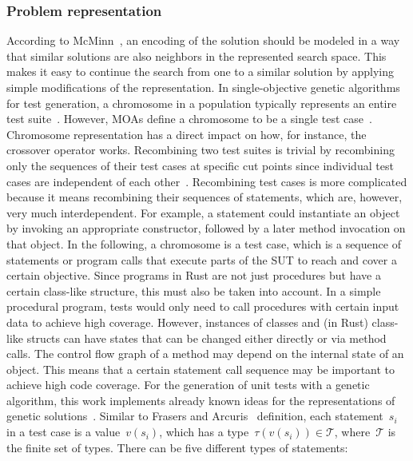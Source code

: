 \documentclass{article}
\begin{document}
\subsubsection{Problem representation}
\label{sec:problem-representation}
According to McMinn~\cite{McMinn_2004}, an encoding of the solution should be modeled in a way that similar solutions are also neighbors in the represented search space. This makes it easy to continue the search from one to a similar solution by applying simple modifications of the representation. In single-objective genetic algorithms for test generation, a chromosome in a population typically represents an entire test suite~\cite{Fraser_2011a, Campos2017}. However, \acp{MOA} define a chromosome to be a single test case~\cite{Panichella2018}. Chromosome representation has a direct impact on how, for instance, the crossover operator works. Recombining two test suites is trivial by recombining only the sequences of their test cases at specific cut points since individual test cases are independent of each other~\cite{Fraser_2013}. Recombining test cases is more complicated because it means recombining their sequences of statements, which are, however, very much interdependent. For example, a statement could instantiate an object by invoking an appropriate constructor, followed by a later method invocation on that object. In the following, a chromosome is a test case, which is a sequence of statements or program calls that execute parts of the \ac{SUT} to reach and cover a certain objective. Since programs in Rust are not just procedures but have a certain class-like structure, this must also be taken into account. In a simple procedural program, tests would only need to call procedures with certain input data to achieve high coverage. However, instances of classes and (in Rust) class-like structs can have states that can be changed either directly or via method calls. The control flow graph of a method may depend on the internal state of an object. This means that a certain statement call sequence may be important to achieve high code coverage. For the generation of unit tests with a genetic algorithm, this work implements already known ideas for the representations of genetic solutions~\cite{Fraser2012,Tonella2004,Arcuri2008}. Similar to Frasers and Arcuris~\cite{Fraser_2011a} definition, each statement~$s_i$ in a test case is a value~$v(s_i)$, which has a type~$\tau(v(s_i)) \in \mathcal{T}$, where~$\mathcal{T}$ is the finite set of types. There can be five different types of statements:
\end{document}
